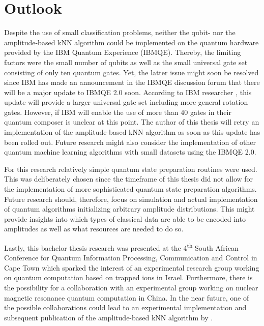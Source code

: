\chapter{Outlook}\label{sec:outlook}

Despite the use of small classification problems, neither the qubit- nor the amplitude-based kNN algorithm could be implemented on the quantum hardware provided by the IBM Quantum Experience (IBMQE). Thereby, the limiting factors were the small number of qubits as well as the small universal gate set consisting of only ten quantum gates. Yet, the latter issue might soon be resolved since IBM has made an announcement in the IBMQE discussion forum that there will be a major update to IBMQE 2.0 soon. According to IBM researcher , this update will provide a larger universal gate set including more general rotation gates. However, if IBM will enable the use of more than 40 gates in their quantum composer is unclear at this point. The author of this thesis will retry an implementation of the amplitude-based kNN algorithm as soon as this update has been rolled out. Future research might also consider the implementation of other quantum machine learning algorithms with small datasets using the IBMQE 2.0.

For this research relatively simple quantum state preparation routines were used. This was deliberately chosen since the timeframe of this thesis did not allow for the implementation of more sophisticated quantum state preparation algorithms. Future research should, therefore, focus on simulation and actual implementation of quantum algorithms initializing arbitrary amplitude distributions. This might provide insights into which types of classical data are able to be encoded into amplitudes as well as what resources are needed to do so.

Lastly, this bachelor thesis research was presented at the 4\textsuperscript{th} South African Conference for Quantum Information Processing, Communication and Control in Cape Town which sparked the interest of an experimental research group working on quantum computation based on trapped ions in Israel. Furthermore, there is the possibility for a collaboration with an experimental group working on nuclear magnetic resonance quantum computation in China. In the near future, one of the possible collaborations could lead to an experimental implementation and subsequent publication of the amplitude-based kNN algorithm by .

